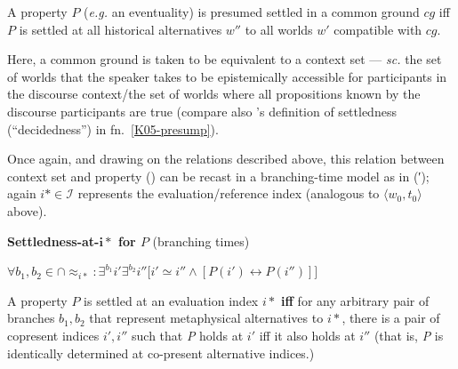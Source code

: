 \documentclass[11pt,dvipsnames]{report}
\begin{document}
A property $P$ (\textit{e.g.} an eventuality) is presumed settled in a common ground $cg$ iff $P$ is settled at all historical alternatives $ w'' $ to all worlds $ w' $ compatible with $ cg $.

Here, a common ground is taken to be equivalent to a context set \citep[$ \cap\textit{cg} $, \textit{cf.}][321\textit{ff}]{Stalnaker1978} --- \textit{sc. }the set of worlds that the speaker takes to be epistemically accessible for participants in the discourse context/the set of worlds where all propositions known by the discourse participants are true (compare also \citeauthor{Kaufmann2005}'s definition of settledness (``decidedness'') in fn.~\ref{K05-presump}).
\xe

Once again, and drawing on the relations described above, this relation between context set and property () can be recast in a branching-time model as in (′); again $ i*\in\mathcal I $ represents the evaluation/reference index (analogous to $ \langle w_0,t_0\rangle $ above).

\pex[exno=\getref{HistNec}′]\textbf{Settledness-at-$ \boldsymbol{i*} $ for $ \boldsymbol{\mathit P} $} (branching times)





\nobreak$\forall b_1,b_2\in\cap{\approx_{i*}}:\exists^{b_1}i'\exists^{b_2}i''\big[i'\simeq i''\wedge [P(i')\leftrightarrow P(i'')]\big]$

\nobreak A property $ P $ is settled at an evaluation index $ i* $ \textbf{iff} for any arbitrary pair of branches $ b_1,b_2 $ that represent metaphysical alternatives to $ i* $, there is a pair of copresent indices $ i',i'' $ such that \textit{P} holds at $ i' $ iff it also holds at $ i'' $ (that is, \textit{P} is identically determined at co-present alternative indices.)
\end{document}
